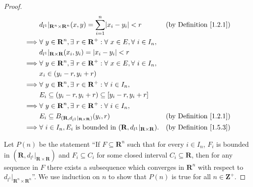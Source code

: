 \begin{proof}
\begin{align*}
                 & d_{l^1}|_{\mathbf{R}^n \times \mathbf{R}^n}(x, y) = \sum_{i = 1}^n \abs*{x_i - y_i} < r                                                                  & \text{(by Definition \ref{1.2.1})} \\
        \implies & \forall\ y \in \mathbf{R}^n, \exists\ r \in \mathbf{R}^+ : \forall\ x \in E, \forall\ i \in I_n,                                                                                              \\
                 & d_{l^1}|_{\mathbf{R} \times \mathbf{R}}(x_i, y_i) = \abs*{x_i - y_i} < r                                                                                                                      \\
        \implies & \forall\ y \in \mathbf{R}^n, \exists\ r \in \mathbf{R}^+ : \forall\ x \in E, \forall\ i \in I_n,                                                                                              \\
                 & x_i \in (y_i - r, y_i + r)                                                                                                                                                                    \\
        \implies & \forall\ y \in \mathbf{R}^n, \exists\ r \in \mathbf{R}^+ : \forall\ i \in I_n,                                                                                                                \\
                 & E_i \subseteq (y_i - r, y_i + r) \subseteq [y_i - r, y_i + r]                                                                                                                                 \\
        \implies & \forall\ y \in \mathbf{R}^n, \exists\ r \in \mathbf{R}^+ : \forall\ i \in I_n,                                                                                                                \\
                 & E_i \subseteq B_{(\mathbf{R}, d_{l^1}|_{\mathbf{R} \times \mathbf{R}})}(y_i, r)                                                                          & \text{(by Definition \ref{1.2.1})} \\
        \implies & \forall\ i \in I_n, E_i \text{ is bounded in } (\mathbf{R}, d_{l^1}|_{\mathbf{R} \times \mathbf{R}}).                                                    & \text{(by Definition \ref{1.5.3})}
    \end{align*}

    Let \(P(n)\) be the statement ``If \(F \subseteq \mathbf{R}^n\) such that for every \(i \in I_n\), \(F_i\) is bounded in \((\mathbf{R}, d_{l^1}|_{\mathbf{R} \times \mathbf{R}})\) and \(F_i \subseteq C_i\) for some closed interval \(C_i \subseteq \mathbf{R}\), then for any sequence in \(F\) there exists a subsequence which converges in \(\mathbf{R}^n\) with respect to \(d_{l^1}|_{\mathbf{R}^n \times \mathbf{R}^n}\)''.
    We use induction on \(n\) to show that \(P(n)\) is true for all \(n \in \mathbf{Z}^+\).


\end{proof}
